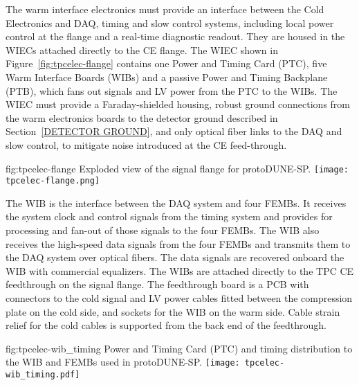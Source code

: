 
The warm interface electronics must provide an interface between the Cold Electronics and DAQ, timing and slow control systems, including local power control at the flange and a real-time diagnostic readout. They are housed in the WIECs attached directly to the CE flange.  The WIEC shown in Figure~\ref{fig:tpcelec-flange} 
contains one
Power and Timing Card (PTC), five Warm Interface Boards (WIBs) and a passive
Power and Timing Backplane (PTB), which fans out signals and LV power from the PTC to the WIBs. The WIEC must provide a Faraday-shielded housing, robust ground connections from the warm electronics boards to the detector ground described in Section~\ref{DETECTOR GROUND}, and only optical fiber links to the DAQ and slow control, to mitigate noise introduced at the CE feed-through.

\begin{dunefigure}
{fig:tpcelec-flange}
{Exploded view of the signal flange for protoDUNE-SP.}
\texttt{[image: tpcelec-flange.png]}
\end{dunefigure}

The WIB is the interface between the
DAQ system and four
FEMBs. It receives the system clock and control signals from the
timing system and provides for processing and fan-out of those signals to the four
FEMBs. The WIB also receives the high-speed data signals from the four 
FEMBs and transmits them to the DAQ system over optical
fibers. The data signals are recovered onboard the WIB with commercial equalizers.
The WIBs are attached directly to the TPC
CE feedthrough on the signal flange. The feedthrough
board is a PCB with connectors to the cold signal and LV power cables fitted
between the compression plate on the cold side, and sockets for
the WIB on the warm side. Cable strain relief for the cold cables is 
supported from the back end of the feedthrough.

\begin{dunefigure}
{fig:tpcelec-wib_timing}
{Power and Timing Card (PTC) and timing distribution to the WIB and FEMBs used in protoDUNE-SP.}
\texttt{[image: tpcelec-wib\_timing.pdf]}
\end{dunefigure}

